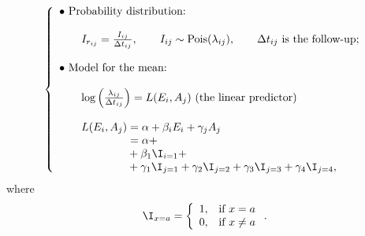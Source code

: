 




\begin{equation}
\label{eq:modelmain}
\left\{
\begin{array}{l}
\bullet\ \text{Probability distribution:} \\ \\
\qquad
I_{r_{ij}}
=
\frac{I_{ij}}{\Delta t_{ij}},
\qquad
I_{ij} \sim  \text{Pois}(\lambda_{ij}),
\qquad
\Delta t_{ij}\text{ is the follow-up;}\\ \\
\bullet\ \text{Model for the mean:} \\ \\
\qquad
\log
\left(
\frac{\lambda_{ij}}{\Delta t_{ij}}
\right)
=
L(E_i, A_j) \text{ (the linear predictor)}\\ \\
\qquad
L(E_i, A_j)
 = 
\alpha + \beta_i E_i + \gamma_j A_j\\
\phantom{
\qquad
L(E_i, A_j)
}
 = 
\alpha + \\
\phantom{
\qquad
L(E_i, A_j)
} + \beta_1 \I_{i=1} + \\
\phantom{
\qquad
L(E_i, A_j)
} + 
\gamma_1 \I_{j=1} +
\gamma_2 \I_{j=2} +
\gamma_3 \I_{j=3} +
\gamma_4 \I_{j=4},
\end{array}
\right.
\end{equation}
where
\begin{equation*}
\I_{x=a}
=
\left\{
\begin{array}{ll}
1, & \text{if } x = a \\
0, & \text{if } x \neq a
\end{array}
\right..
\end{equation*}

